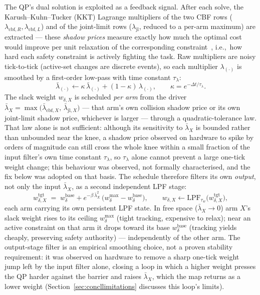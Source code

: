 \documentclass[12pt,a4paper,twoside,openright]{report}
\begin{document}
The QP's dual solution is exploited as a feedback signal. After each solve, the Karush--Kuhn--Tucker (KKT) Lagrange multipliers of the two CBF rows ($\lambda_{\text{cbf},R},\lambda_{\text{cbf},L}$) and of the joint-limit rows ($\lambda_{\text{jl}}$, reduced to a per-arm maximum) are extracted --- these \emph{shadow prices} measure exactly how much the optimal cost would improve per unit relaxation of the corresponding constraint~\cite{boyd2004}, i.e.,\ how hard each safety constraint is actively fighting the task. Raw multipliers are noisy tick-to-tick (active-set changes are discrete events), so each multiplier $\lambda_{(\cdot)}$ is smoothed by a first-order low-pass with time constant $\tau_{\lambda}$:
\begin{equation}
\bar{\lambda}_{(\cdot)} \leftarrow \kappa\,\bar{\lambda}_{(\cdot)} + (1-\kappa)\,\lambda_{(\cdot)}, \qquad \kappa = e^{-\Delta t/\tau_{\lambda}}.
\end{equation}
The slack weight $w_{\delta,X}$ is scheduled \emph{per arm} from the driver $\bar{\lambda}_X = \max\bigl(\bar{\lambda}_{\text{cbf},X},\, \bar{\lambda}_{\text{jl},X}\bigr)$ --- that arm's own collision shadow price or its own joint-limit shadow price, whichever is larger --- through a quadratic-tolerance law. That law alone is not sufficient: although its sensitivity to $\bar\lambda_X$ is bounded rather than unbounded near the knee, a shadow price observed on hardware to spike by orders of magnitude can still cross the whole knee within a small fraction of the input filter's own time constant $\tau_\lambda$, so $\tau_\lambda$ alone cannot prevent a large one-tick weight change; this behaviour was observed, not formally characterised, and the fix below was adopted on that basis. The schedule therefore filters its own \emph{output}, not only the input $\bar\lambda_X$, as a second independent LPF stage:
\begin{equation}
w_{\delta,X}^{\text{tgt}} \;=\; w_{\delta}^{\text{base}} + e^{-\beta\,\bar{\lambda}_X^2}\,\bigl(w_{\delta}^{\max} - w_{\delta}^{\text{base}}\bigr),
\qquad w_{\delta,X} \leftarrow \text{LPF}_{\tau_{w}}\bigl(w_{\delta,X}^{\text{tgt}}\bigr),
\label{eq:slacksched}
\end{equation}
each arm carrying its own persistent LPF state. In free space ($\bar{\lambda}_X\to 0$) arm $X$'s slack weight rises to its ceiling $w_{\delta}^{\max}$ (tight tracking, expensive to relax); near an active constraint on that arm it drops toward its base $w_{\delta}^{\text{base}}$ (tracking yields cheaply, preserving safety authority) --- independently of the other arm. The output-stage filter is an empirical smoothing choice, not a proven stability requirement: it was observed on hardware to remove a sharp one-tick weight jump left by the input filter alone, closing a loop in which a higher weight presses the QP harder against the barrier and raises $\bar\lambda_X$, which the map returns as a lower weight (Section~\ref{sec:concllimitations} discusses this loop's limits).
\end{document}
